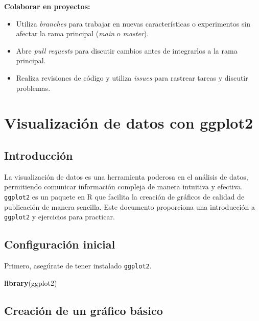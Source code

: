\documentclass[
]{book}
\newenvironment{Shaded}{\begin{snugshade}}{\end{snugshade}}
\newcommand{\FunctionTok}[1]{\textcolor[rgb]{0.13,0.29,0.53}{\textbf{#1}}}
\newcommand{\NormalTok}[1]{#1}
\providecommand{\tightlist}{%
  \setlength{\itemsep}{0pt}\setlength{\parskip}{0pt}}
\begin{document}
\textbf{Colaborar en proyectos:}

\begin{itemize}
\tightlist
\item
  Utiliza \emph{branches} para trabajar en nuevas características o experimentos sin afectar la rama principal (\emph{main} o \emph{master}).
\item
  Abre \emph{pull requests} para discutir cambios antes de integrarlos a la rama principal.
\item
  Realiza revisiones de código y utiliza \emph{issues} para rastrear tareas y discutir problemas.
\end{itemize}

\hypertarget{visualizaciuxf3n-de-datos-con-ggplot2}{%
\chapter{Visualización de datos con ggplot2}\label{visualizaciuxf3n-de-datos-con-ggplot2}}

\hypertarget{introducciuxf3n}{%
\section{Introducción}\label{introducciuxf3n}}

La visualización de datos es una herramienta poderosa en el análisis de datos, permitiendo comunicar información compleja de manera intuitiva y efectiva. \texttt{ggplot2} es un paquete en R que facilita la creación de gráficos de calidad de publicación de manera sencilla. Este documento proporciona una introducción a \texttt{ggplot2} y ejercicios para practicar.

\hypertarget{configuraciuxf3n-inicial}{%
\section{Configuración inicial}\label{configuraciuxf3n-inicial}}

Primero, asegúrate de tener instalado \texttt{ggplot2}.

\begin{Shaded}
\begin{Highlighting}[]
\FunctionTok{library}\NormalTok{(ggplot2)}
\end{Highlighting}
\end{Shaded}

\hypertarget{creaciuxf3n-de-un-gruxe1fico-buxe1sico}{%
\section{Creación de un gráfico básico}\label{creaciuxf3n-de-un-gruxe1fico-buxe1sico}}
\end{document}
